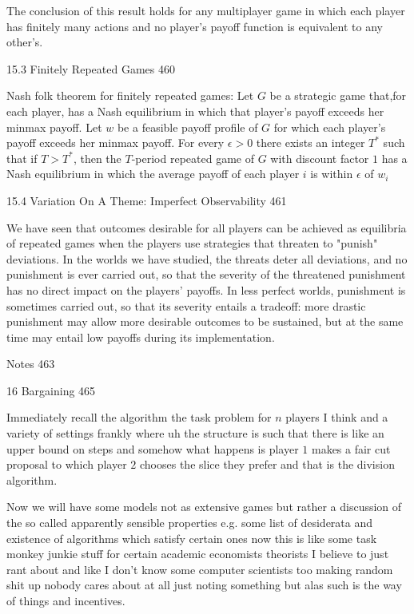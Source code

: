 The conclusion of this result holds for any multiplayer game in which each player has finitely many actions and no player's payoff function is equivalent to any other's.

15.3 Finitely Repeated Games 460

Nash folk theorem for finitely repeated games: Let $G$ be a strategic game that,for each player, has a Nash equilibrium in which that player's payoff exceeds her minmax payoff. Let $w$ be a feasible payoff profile of $G$ for which each player's payoff exceeds her minmax payoff. For every $\epsilon>0$ there exists an integer $T^*$ such that if $T>T^*$, then the $T$-period repeated game of $G$ with discount factor $1$ has a Nash equilibrium in which the average payoff of each player $i$ is within $\epsilon$ of $w_i$

15.4 Variation On A Theme: Imperfect Observability 461

We have seen that outcomes desirable for all players can be achieved as equilibria of repeated games when the players use strategies that threaten to "punish" deviations. In the worlds we have studied, the threats deter all deviations, and no punishment is ever carried out, so that the severity of the threatened punishment has no direct impact on the players' payoffs. In less perfect worlds, punishment is sometimes carried out, so that its severity entails a tradeoff: more drastic punishment may allow more desirable outcomes to be sustained, but at the same time may entail low payoffs during its implementation.

Notes 463



16 Bargaining 465

Immediately recall the algorithm the task problem for $n$ players I think and a variety of settings frankly where uh the structure is such that there is like an upper bound on steps and somehow what happens is player $1$ makes a fair cut proposal to which player $2$ chooses the slice they prefer and that is the division algorithm.

Now we will have some models not as extensive games but rather a discussion of the so called apparently sensible properties e.g. some list of desiderata and existence of algorithms which satisfy certain ones now this is like some task monkey junkie stuff for certain academic economists theorists I believe to just rant about and like I don't know some computer scientists too making random shit up nobody cares about at all just noting something but alas such is the way of things and incentives.


